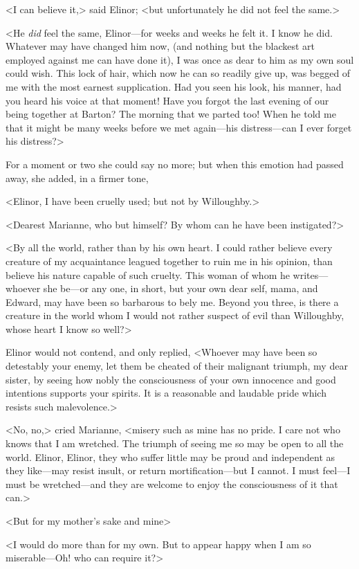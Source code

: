 <I can believe it,> said Elinor; <but unfortunately he did not feel the same.>

<He \textit{did} feel the same, Elinor—for weeks and weeks he felt it. I know he did. Whatever may have changed him now, (and nothing but the blackest art employed against me can have done it), I was once as dear to him as my own soul could wish. This lock of hair, which now he can so readily give up, was begged of me with the most earnest supplication. Had you seen his look, his manner, had you heard his voice at that moment! Have you forgot the last evening of our being together at Barton? The morning that we parted too! When he told me that it might be many weeks before we met again—his distress—can I ever forget his distress?>

For a moment or two she could say no more; but when this emotion had passed away, she added, in a firmer tone,

<Elinor, I have been cruelly used; but not by Willoughby.>

<Dearest Marianne, who but himself? By whom can he have been instigated?>

<By all the world, rather than by his own heart. I could rather believe every creature of my acquaintance leagued together to ruin me in his opinion, than believe his nature capable of such cruelty. This woman of whom he writes—whoever she be—or any one, in short, but your own dear self, mama, and Edward, may have been so barbarous to bely me. Beyond you three, is there a creature in the world whom I would not rather suspect of evil than Willoughby, whose heart I know so well?>

Elinor would not contend, and only replied, <Whoever may have been so detestably your enemy, let them be cheated of their malignant triumph, my dear sister, by seeing how nobly the consciousness of your own innocence and good intentions supports your spirits. It is a reasonable and laudable pride which resists such malevolence.>

<No, no,> cried Marianne, <misery such as mine has no pride. I care not who knows that I am wretched. The triumph of seeing me so may be open to all the world. Elinor, Elinor, they who suffer little may be proud and independent as they like—may resist insult, or return mortification—but I cannot. I must feel—I must be wretched—and they are welcome to enjoy the consciousness of it that can.>

<But for my mother's sake and mine\longdash>

<I would do more than for my own. But to appear happy when I am so miserable—Oh! who can require it?>


